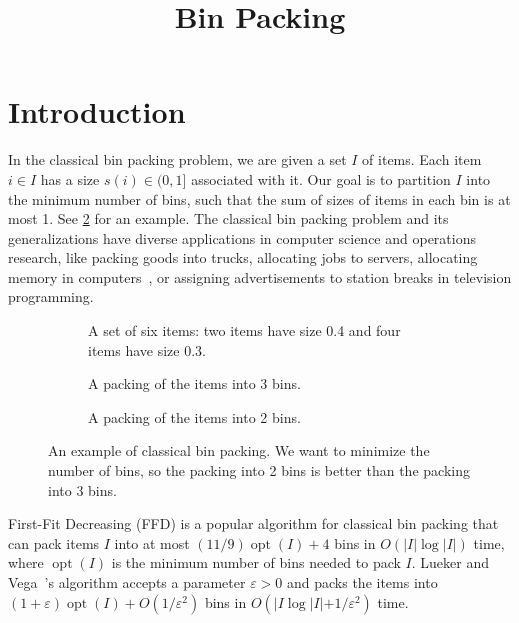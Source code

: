 \documentclass[a4paper,11pt,fleqn]{article}
\title{Bin Packing}
\author{\empty}
\date{\empty}
\DeclareMathOperator{\opt}{opt}
\let\eps\varepsilon
\begin{document}
\maketitle
\setlength{\parskip}{0.35em}

\section{Introduction}

In the classical bin packing problem, we are given a set $I$ of items.
Each item $i \in I$ has a size $s(i) \in (0, 1]$ associated with it.
Our goal is to partition $I$ into the minimum number of bins,
such that the sum of sizes of items in each bin is at most 1.
See \cref{fig:1bp} for an example.
The classical bin packing problem and its generalizations
have diverse applications in computer science and operations research,
like packing goods into trucks, allocating jobs to servers,
allocating memory in computers~\cite{handbook-of-combinopt-bp},
or assigning advertisements to station breaks in television programming.

\begin{figure}[!ht]
\centering
\begin{subfigure}{0.9\textwidth}
    \centering
    
    \caption{A set of six items: two items have size 0.4 and four items have size 0.3.}%
\label{fig:1bp:a}
\end{subfigure}
\par\bigskip\bigskip
\begin{subfigure}{0.45\textwidth}
    \centering
    
    \caption{A packing of the items into 3 bins.}
\end{subfigure}
\begin{subfigure}{0.45\textwidth}
    \centering
    
    \caption{A packing of the items into 2 bins.}
\end{subfigure}
\caption[An example of classical bin packing.]{An example of classical bin packing.
We want to minimize the number of bins, so the packing into 2 bins
is better than the packing into 3 bins.}
\label{fig:1bp}
\end{figure}

First-Fit Decreasing (FFD) is a popular algorithm for classical bin packing
that can pack items $I$ into at most $(11/9)\opt(I) + 4$ bins in $O(|I|\log|I|)$ time,
where $\opt(I)$ is the minimum number of bins needed to pack $I$.
Lueker and Vega~\cite{bp-aptas}'s algorithm accepts a parameter $\eps > 0$
and packs the items into $(1+\eps)\opt(I) + O(1/\eps^2)$ bins in $O(|I\log |I| + 1/\eps^2)$ time.
\end{document}
